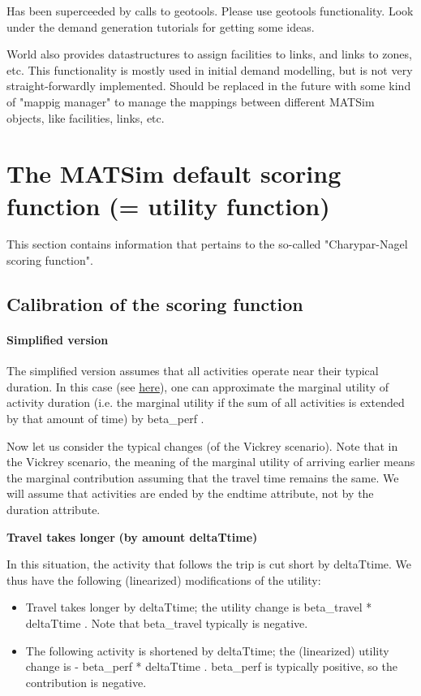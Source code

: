 \documentclass[a4paper,11pt]{report}
\begin{document}
Has been superceeded by calls to geotools. Please use geotools  functionality. Look under the demand generation tutorials for  getting some ideas.

World also provides datastructures to assign facilities to links, and  links to zones, etc. This functionality is mostly used in initial  demand modelling, but is not very straight-forwardly implemented. Should  be replaced in the future with some kind of "mappig manager" to manage  the mappings between different MATSim objects, like facilities, links,  etc.

\chapter{The MATSim default scoring function (= utility function)}

This section contains information that pertains to the so-called "Charypar-Nagel scoring function".

\vfill\eject
\section{Calibration of the scoring function}

\subsubsection{Simplified version}

The simplified version assumes that all activities operate near their typical duration. In this case (see \href{http://matsim.org/node/651}{here}),  one can approximate the marginal utility of activity duration (i.e. the  marginal utility if the sum of all activities is extended by that  amount of time) by beta\_perf .

Now let us consider the typical changes (of the Vickrey  scenario). Note that in the Vickrey scenario, the meaning of the  marginal utility of arriving earlier means the marginal contribution  assuming that the travel time remains the same. We will assume  that activities are ended by the endtime attribute, not by the duration  attribute.

\textbf{Travel takes longer}\textbf{ (by amount deltaTtime)}

In this situation, the activity that follows the trip is cut short by  deltaTtime. We thus have the following (linearized) modifications  of the utility:
\begin{itemize}
	\item Travel takes longer by deltaTtime; the utility change is  beta\_travel * deltaTtime . Note that beta\_travel typically is  negative.
	\item The following activity is shortened by deltaTtime; the (linearized)  utility change is - beta\_perf * deltaTtime . beta\_perf is  typically positive, so the contribution is negative.
\end{itemize}
\end{document}
